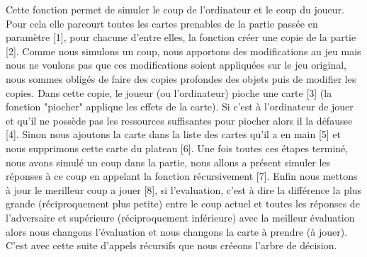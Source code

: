 \documentclass[12pt]{article}
\begin{document}
		Cette fonction permet de simuler le coup de l'ordinateur et le coup du joueur. Pour cela elle parcourt toutes les cartes prenables de la partie passée en paramètre [1], pour chacune d'entre elles, la fonction créer une copie de la partie [2]. Comme nous simulons un coup, nous apportons des modifications au jeu mais nous ne voulons pas que ces modifications soient appliquées sur le jeu original, nous sommes obligés de faire des copies profondes des objets puis de modifier les copies. Dans cette copie, le joueur (ou l'ordinateur) pioche une carte [3] (la fonction "piocher" applique les effets de la carte). Si c'est à l'ordinateur de jouer et qu'il ne possède pas les ressources suffisantes pour piocher alors il la défausse [4]. Sinon nous ajoutons la carte dans la liste des cartes qu'il a en main [5] et nous supprimons cette carte du plateau [6]. Une fois toutes ces étapes terminé, nous avons simulé un coup dans la partie, nous allons a présent simuler les réponses à ce coup en appelant la fonction récursivement [7]. Enfin nous mettons à jour le merilleur coup a jouer [8], si l'evaluation, c'est à dire la différence la plus grande (réciproquement plus petite) entre le coup actuel et toutes les réponses de l'adversaire et supérieure (réciproquement inférieure) avec la meilleur évaluation alors nous changons l'évaluation et nous changons la carte à prendre (à jouer). C'est avec cette suite d'appels récursifs que nous créeons l'arbre de décision.\\
\end{document}

